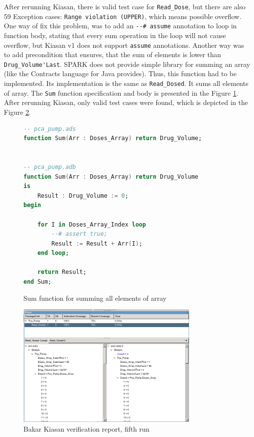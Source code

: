 After rerunning Kiasan, there is valid test case for \lstinline{Read_Dose}, but there are also 59 Exception cases: \lstinline{Range violation (UPPER)}, which means possible overflow. One way of fix this problem, was to add an \lstinline{--# assume} annotation to loop in function body, stating that every sum operation in the loop will not cause overflow, but Kiasan v1 does not support \lstinline{assume} annotations. Another way was to add precondition that ensures, that the sum of elements is lower than \lstinline{Drug_Volume'Last}. SPARK does not provide simple library for summing an array (like the Contracts language for Java provides). Thus, this function had to be implemented. Its implementation is the same as \lstinline{Read_Dosed}. It sums all elements of array. The \lstinline{Sum} function specification and body is presented in the Figure \ref{listing:sum_function}. After rerunning Kiasan, only valid test cases were found, which is depicted in the Figure \ref{figure:sparkverification:kiasanreport5}.

\begin{figure}[h]
\singlespacing
\begin{lstlisting}[language=ada, frame=single, gobble=0]
-- pca_pump.ads
function Sum(Arr : Doses_Array) return Drug_Volume;


-- pca_pump.adb
function Sum(Arr : Doses_Array) return Drug_Volume
is
    Result : Drug_Volume := 0;
begin
    
    for I in Doses_Array_Index loop
        --# assert true;
        Result := Result + Arr(I);
    end loop;
    
    return Result;
end Sum;
\end{lstlisting}
\doublespacing
\caption{Sum function for summing all elements of array}
\label{listing:sum_function}
\end{figure}

\begin{figure}[ht]%
    \begin{center}
        \includegraphics[width=0.8\textwidth]{figures/pca-pump-verification-step5.png}        
    \end{center}
    \caption{Bakar Kiasan verification report, fifth run}
    \label{figure:sparkverification:kiasanreport5}
\end{figure}

